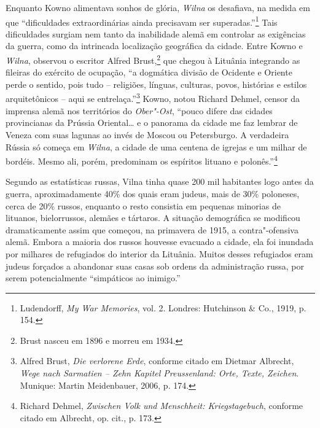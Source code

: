 Enquanto Kowno alimentava sonhos de glória, \textit{Wilna} os desafiava, na
medida em que ``dificuldades extraordinárias ainda precisavam ser
superadas.''\footnote{Ludendorff, \textit{My War Memories}, vol. 2. Londres: Hutchinson \& Co., 1919, p. 154.} Tais dificuldades surgiam nem tanto da inabilidade alemã em controlar as exigências da guerra,
como da intrincada localização geográfica da cidade. Entre Kowno e
\textit{Wilna}, observou o escritor Alfred Brust,\footnote{Brust nasceu em 1896 e morreu em 1934.} que chegou à
Lituânia integrando as fileiras do exército de ocupação, ``a dogmática
divisão de Ocidente e Oriente perde o sentido, pois tudo -- religiões,
línguas, culturas, povos, histórias e estilos arquitetônicos -- aqui se
entrelaça.''\footnote{Alfred Brust, \textit{Die verlorene Erde}, conforme citado em Dietmar Albrecht, \textit{Wege nach Sarmatien -- Zehn Kapitel Preussenland: Orte, Texte, Zeichen}. Munique: Martin Meidenbauer, 2006, p. 174.} Kowno, notou Richard Dehmel, censor da imprensa alemã nos territórios do \textit{Ober"-Ost}, ``pouco difere das cidades
provincianas da Prússia Oriental\ldots{} e o panorama da cidade me faz
lembrar de Veneza com suas lagunas ao invés de Moscou ou Petersburgo. A
verdadeira Rússia só começa em \textit{Wilna}, a cidade de uma centena de igrejas
e um milhar de bordéis. Mesmo ali, porém, predominam os espíritos
lituano e polonês.''\footnote{Richard Dehmel, \textit{Zwischen Volk und Menschheit: Kriegstagebuch}, conforme citado em Albrecht, op. cit., p. 173.}

Segundo as estatísticas russas, Vilna tinha quase 200 mil habitantes
logo antes da guerra, aproximadamente 40\% dos quais eram judeus, mais
de 30\% poloneses, cerca de 20\% russos, enquanto o resto consistia em
pequenas minorias de lituanos, bielorrussos, alemães e tártaros. A
situação demográfica se modificou dramaticamente assim que começou, na
primavera de 1915, a contra"-ofensiva alemã. Embora a maioria dos russos
houvesse evacuado a cidade, ela foi inundada por milhares de refugiados
do interior da Lituânia. Muitos desses refugiados eram judeus forçados a
abandonar suas casas sob ordens da administração russa, por serem
potencialmente ``simpáticos ao inimigo.''

